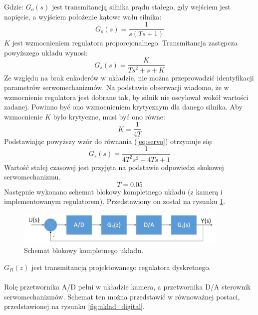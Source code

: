 \noindent Gdzie:\newline
\(G_o(s)\) jest transmitancją silnika prądu stałego, gdy wejściem jest napięcie, a wyjściem położenie kątowe wału silnika:
\begin{equation}
G_o(s)=\frac{1}{s(Ts+1)}
\end{equation}
\(K\) jest wzmocnieniem regulatora proporcjonalnego.\newline
Transmitancja zastępcza powyższego układu wynosi:
\begin{equation}
\label{eq:servo}
G_s(s)=\frac{K}{Ts^2+s+K}
\end{equation}
Ze względu na brak enkoderów w układzie, nie można przeprowadzić identyfikacji parametrów serwomechanizmów.
Na podstawie obserwacji wiadomo, że w wzmocnienie regulatora jest dobrane tak, by silnik nie oscylował wokół wartości zadanej.
Powinno być ono wzmocnieniem krytycznym dla danego silnika.
Aby wzmocnienie \(K\) było krytyczne, musi być ono równe:
\begin{equation}
\label{eq:kryt}
K=\frac{1}{4T}
\end{equation}
Podstawiając powyższy wzór do równania (\ref{eq:servo}) otrzymuje się:
\begin{equation}
G_s(s)=\frac{1}{4T^2s^2+4Ts+1}
\end{equation}
Wartość stałej czasowej jest przyjęta na podstawie odpowiedzi skokowej serwomechanizmu.
\begin{equation}
T=0.05
\end{equation}
Następnie wykonano schemat blokowy kompletnego układu (z kamerą i implementowanym regulatorem).
Przedstawiony on został na rysunku \ref{fig:uklad}.

\begin{figure}[h]
	\centering
	\includegraphics[width=4in]{uklad.jpg}
	\caption{Schemat blokowy kompletnego układu.}
	\label{fig:uklad}
\end{figure}

\(G_R(z)\) jest transmitancją projektowanego regulatora dyskretnego.
\paragraph*{}
Rolę przetwornika A/D pełni w układzie kamera, a przetwornika D/A sterownik serwomechanizmów. 
Schemat ten można przedstawić w równoważnej postaci, przedstawionej na rysunku \ref{fig:uklad_digital}.

